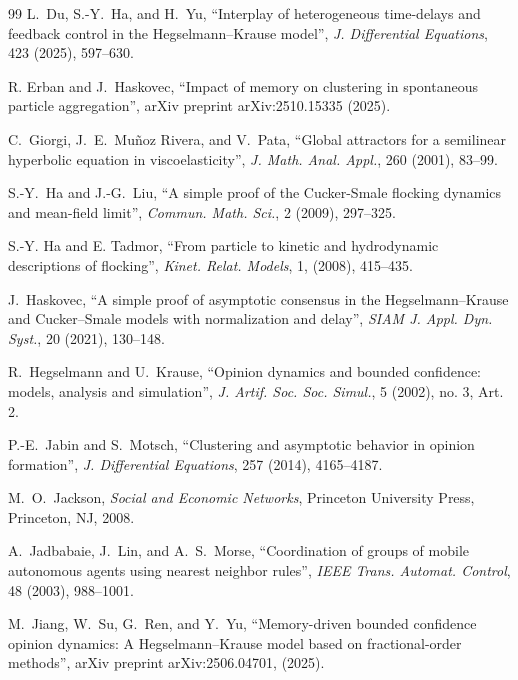 \documentclass[11pt]{amsart}
\numberwithin{equation}{section}
\begin{document}
\begin{thebibliography}{99}
L.~Du, S.-Y.~Ha, and H.~Yu, ``Interplay of heterogeneous time-delays and feedback control in the Hegselmann--Krause model'', \textit{J. Differential Equations}, 423 (2025), 597--630.

R. Erban and J.~Haskovec, ``Impact of memory on clustering in spontaneous particle aggregation'',  arXiv preprint arXiv:2510.15335 (2025).

C.~Giorgi, J.~E.~Mu\~{n}oz Rivera, and V.~Pata, ``Global attractors for a semilinear hyperbolic equation in viscoelasticity'', \textit{J. Math. Anal. Appl.}, 260 (2001), 83--99.


S.-Y.~Ha and J.-G.~Liu, ``A simple proof of the  Cucker-Smale flocking
dynamics and mean-field limit'', \textit{Commun. Math. Sci.}, 2 (2009), 297--325.


S.-Y. Ha and E. Tadmor,
``From particle to kinetic and hydrodynamic descriptions of
	flocking'',
\textit{Kinet. Relat. Models}, 1, (2008), 415--435.



J.~Haskovec, ``A simple proof of asymptotic consensus in the Hegselmann--Krause and Cucker--Smale models with normalization and delay'', \textit{SIAM J. Appl. Dyn. Syst.}, 20 (2021), 130--148.



R.~Hegselmann and U.~Krause, ``Opinion dynamics and bounded confidence: models, analysis and simulation'', \textit{J. Artif. Soc. Soc. Simul.}, 5 (2002), no. 3, Art. 2.


P.-E.~Jabin and S.~Motsch, ``Clustering and asymptotic behavior in opinion formation'', \textit{J. Differential Equations}, 257 (2014), 4165--4187.

M.~O.~Jackson, \textit{Social and Economic Networks}, Princeton University Press, Princeton, NJ, 2008.

A.~Jadbabaie, J.~Lin, and A.~S.~Morse, ``Coordination of groups of mobile autonomous agents using nearest neighbor rules'', \textit{IEEE Trans. Automat. Control}, 48 (2003), 988--1001.

M.~Jiang, W.~Su, G.~Ren, and Y.~Yu, ``Memory-driven bounded confidence opinion dynamics: A Hegselmann--Krause model based on fractional-order methods'', arXiv preprint arXiv:2506.04701, (2025).


\end{thebibliography}
\end{document}
